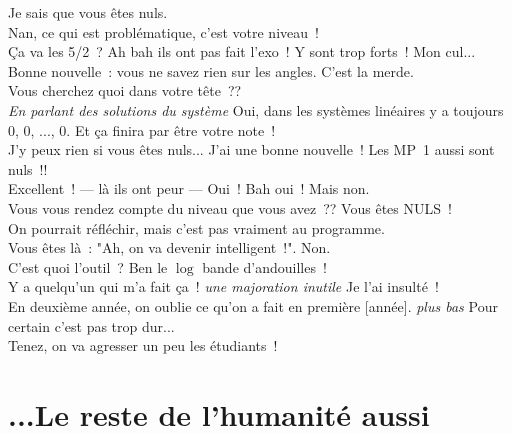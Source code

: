 \documentclass[french, a4paper, openany]{book}
\begin{document}
		\og Je sais que vous êtes nuls. \fg \\
		\og Nan, ce qui est problématique, c'est votre niveau~! \fg \\
		\og Ça va les 5/2~? Ah bah ils ont pas fait l'exo~! Y sont trop forts~! Mon cul... \fg \\
		\og Bonne nouvelle~: vous ne savez rien sur les angles. C'est la merde. \fg \\
		\og Vous cherchez quoi dans votre tête~?? \fg \\
		\emph{En parlant des solutions du système} \og Oui, dans les systèmes linéaires y a toujours 0, 0, ..., 0. Et ça finira par être votre note~! \fg \\
		\og J'y peux rien si vous êtes nuls... J'ai une bonne nouvelle~! Les MP~1 aussi sont nuls~!! \fg \\
		\og Excellent~! — là ils ont peur — Oui~! Bah oui~! Mais non. \fg \\
		\og Vous vous rendez compte du niveau que vous avez~?? Vous êtes NULS~! \fg \\
		\og On pourrait réfléchir, mais c'est pas vraiment au programme. \fg \\
		\og Vous êtes là~: "Ah, on va devenir intelligent~!". Non. \fg \\
		\og C'est quoi l'outil~? Ben le $\log$ bande d'andouilles~! \fg \\
		\og Y a quelqu'un qui m'a fait ça~! \emph{une majoration inutile} Je l'ai insulté~! \fg \\
		\og En deuxième année, on oublie ce qu'on a fait en première [année]. \emph{plus bas} Pour certain c'est pas trop dur... \fg \\
		\og Tenez, on va agresser un peu les étudiants~! \fg \\
	
\section*{...Le reste de l'humanité aussi}
\end{document}
